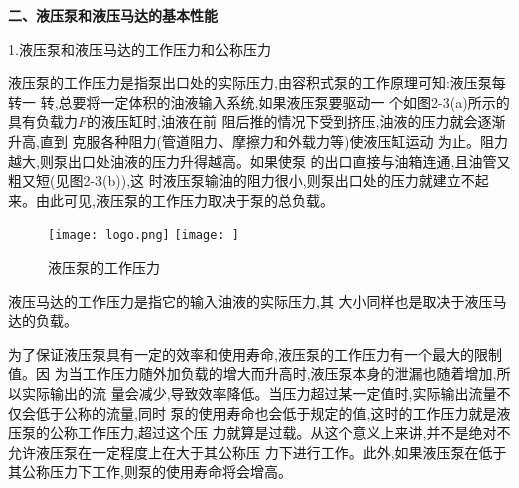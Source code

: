 \textbf{二、液压泵和液压马达的基本性能}

1.{\kaishu 液压泵和液压马达的工作压力和公称压力}

液压泵的工作压力是指泵出口处的实际压力,由容积式泵的工作原理可知:液压泵每转一
转,总要将一定体积的油液输入系统,如果液压泵要驱动一
个如图2-3(a)所示的具有负载力$F$的液压缸时,油液在前
阻后推的情况下受到挤压,油液的压力就会逐渐升高,直到
克服各种阻力(管道阻力、摩擦力和外载力等)使液压缸运动
为止。阻力越大,则泵出口处油液的压力升得越高。如果使泵
的出口直接与油箱连通,且油管又粗又短(见图2-3(b)),这
时液压泵输油的阻力很小,则泵出口处的压力就建立不起
来。由此可见,液压泵的工作压力取决于泵的总负载。

\begin{figure}[h]
\centering
\ifOpenSource
\texttt{[image: logo.png]}
\else
\texttt{[image: ]}
\fi
\caption{液压泵的工作压力}
\label{fig:fig0203}
\end{figure}

液压马达的工作压力是指它的输入油液的实际压力,其
大小同样也是取决于液压马达的负载。

为了保证液压泵具有一定的效率和使用寿命,液压泵的工作压力有一个最大的限制值。因
为当工作压力随外加负载的增大而升高时,液压泵本身的泄漏也随着增加,所以实际输出的流
量会减少,导致效率降低。当压力超过某一定值时,实际输出流量不仅会低于公称的流量,同时
泵的使用寿命也会低于规定的值,这时的工作压力就是液压泵的公称工作压力,超过这个压
力就算是过载。从这个意义上来讲,并不是绝对不允许液压泵在一定程度上在大于其公称压
力下进行工作。此外,如果液压泵在低于其公称压力下工作,则泵的使用寿命将会增高。